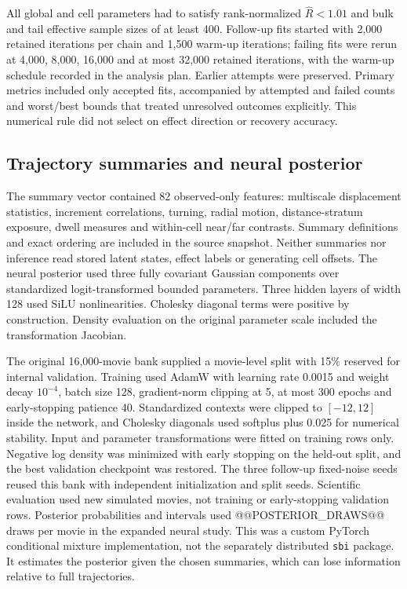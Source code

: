 \documentclass[12pt]{article}
\begin{document}
All global and cell parameters had to satisfy rank-normalized $\widehat R<1.01$ and bulk and tail effective sample sizes of at least 400\citep{vehtari2021}. Follow-up fits started with 2,000 retained iterations per chain and 1,500 warm-up iterations; failing fits were rerun at 4,000, 8,000, 16,000 and at most 32,000 retained iterations, with the warm-up schedule recorded in the analysis plan. Earlier attempts were preserved. Primary metrics included only accepted fits, accompanied by attempted and failed counts and worst/best bounds that treated unresolved outcomes explicitly. This numerical rule did not select on effect direction or recovery accuracy.

\subsection*{Trajectory summaries and neural posterior}
The summary vector contained 82 observed-only features: multiscale displacement statistics, increment correlations, turning, radial motion, distance-stratum exposure, dwell measures and within-cell near/far contrasts. Summary definitions and exact ordering are included in the source snapshot. Neither summaries nor inference read stored latent states, effect labels or generating cell offsets. The neural posterior used three fully covariant Gaussian components over standardized logit-transformed bounded parameters. Three hidden layers of width 128 used SiLU nonlinearities. Cholesky diagonal terms were positive by construction. Density evaluation on the original parameter scale included the transformation Jacobian.

The original 16,000-movie bank supplied a movie-level split with 15\% reserved for internal validation. Training used AdamW with learning rate 0.0015 and weight decay $10^{-4}$, batch size 128, gradient-norm clipping at 5, at most 300 epochs and early-stopping patience 40. Standardized contexts were clipped to $[-12,12]$ inside the network, and Cholesky diagonals used softplus plus 0.025 for numerical stability. Input and parameter transformations were fitted on training rows only. Negative log density was minimized with early stopping on the held-out split, and the best validation checkpoint was restored. The three follow-up fixed-noise seeds reused this bank with independent initialization and split seeds. Scientific evaluation used new simulated movies, not training or early-stopping validation rows. Posterior probabilities and intervals used @@POSTERIOR_DRAWS@@ draws per movie in the expanded neural study. This was a custom PyTorch conditional mixture implementation, not the separately distributed \texttt{sbi} package. It estimates the posterior given the chosen summaries, which can lose information relative to full trajectories\citep{papamakarios2016,lueckmann2021}.
\end{document}
